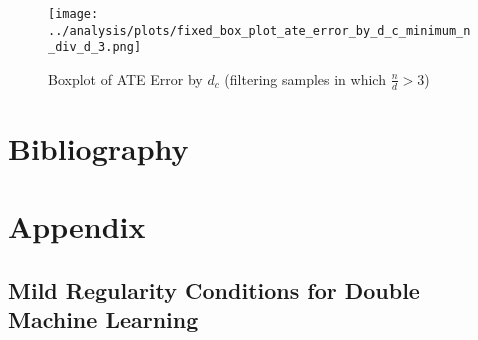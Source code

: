 \documentclass{article}
\numberwithin{equation}{section}
\begin{document}
\begin{figure}[H]
    \centering
    \texttt{[image: ../analysis/plots/fixed\_box\_plot\_ate\_error\_by\_d\_c\_minimum\_n\_div\_d\_3.png]}
    \caption{Boxplot of ATE Error by $d_c$ (filtering samples in which $\frac{n}{d} > 3$)}
\end{figure}

\newpage

\section{Bibliography}



\newpage

\section{Appendix}

\subsection{Mild Regularity Conditions for Double Machine Learning}
\label{subsec:appendix_mild_regularity_conditions_for_dml}
\end{document}
